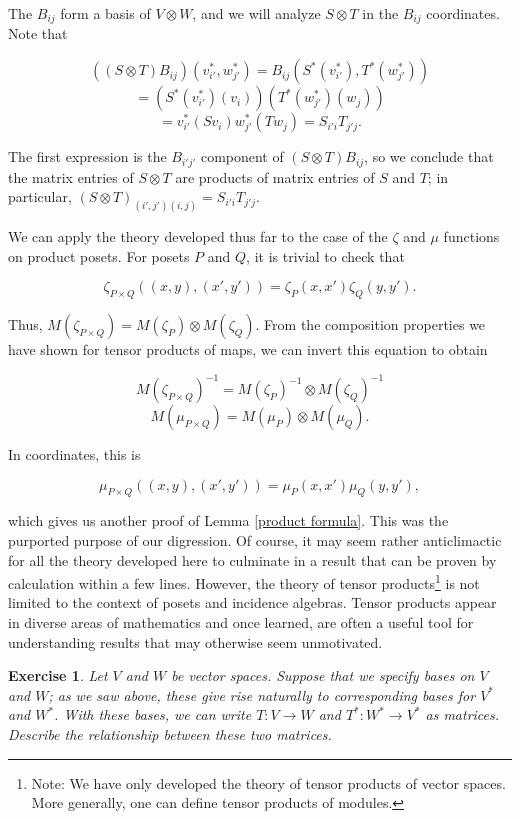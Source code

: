 \documentclass[11pt]{article}
\newtheorem{exercise}[theorem]{Exercise}
\begin{document}
The $B_{ij}$ form a basis of $V \otimes W$, and we will analyze $S
\otimes T$ in the $B_{ij}$ coordinates. Note that

\[ ((S \otimes T) B_{ij})(v^*_{i'}, w^*_{j'}) = B_{ij}(S^*(v^*_{i'}), T^*(w^*_{j'})) \]
\[ = \left( S^*(v^*_{i'})(v_i) \right) \left( T^*(w^*_{j'})(w_j) \right) \]
\[ = v^*_{i'}(Sv_i) w^*_{j'}(Tw_j) = S_{i'i}T_{j'j}. \]

The first expression is the $B_{i'j'}$ component of $(S \otimes T)
B_{ij}$, so we conclude that the matrix entries of $S \otimes T$ are
products of matrix entries of $S$ and $T$; in particular, $(S \otimes
T)_{(i', j')(i, j)} = S_{i'i} T_{j'j}$.

We can apply the theory developed thus far to the case of the $\zeta$
and $\mu$ functions on product posets. For posets $P$ and $Q$, it is
trivial to check that

\[ \zeta_{P \times Q} \left( (x, y), (x', y') \right) = \zeta_P(x, x') \zeta_Q(y, y'). \]

Thus, $M(\zeta_{P \times Q}) = M(\zeta_P) \otimes M(\zeta_Q)$. From
the composition properties we have shown for tensor products of maps,
we can invert this equation to obtain

\[ M(\zeta_{P \times Q})^{-1} = M(\zeta_P)^{-1} \otimes M(\zeta_Q)^{-1} \]
\[ M(\mu_{P \times Q}) = M(\mu_P) \otimes M(\mu_Q). \]

In coordinates, this is

\[ \mu_{P \times Q} \left( (x, y), (x', y') \right) = \mu_P(x, x') \mu_Q(y, y'), \]

which gives us another proof of Lemma \ref{product formula}. This was
the purported purpose of our digression. Of course, it may seem rather
anticlimactic for all the theory developed here to culminate in a
result that can be proven by calculation within a few lines. However,
the theory of tensor products\footnote{Note: We have only developed
  the theory of tensor products of vector spaces. More generally, one
  can define tensor products of modules.} is not limited to the
context of posets and incidence algebras. Tensor products appear in
diverse areas of mathematics and once learned, are often a useful tool
for understanding results that may otherwise seem unmotivated.

\begin{exercise}
Let $V$ and $W$ be vector spaces. Suppose that we specify bases on $V$
and $W$; as we saw above, these give rise naturally to corresponding
bases for $V^*$ and $W^*$. With these bases, we can write $T : V \to
W$ and $T^* : W^* \to V^*$ as matrices. Describe the relationship
between these two matrices.
\end{exercise}
\end{document}
